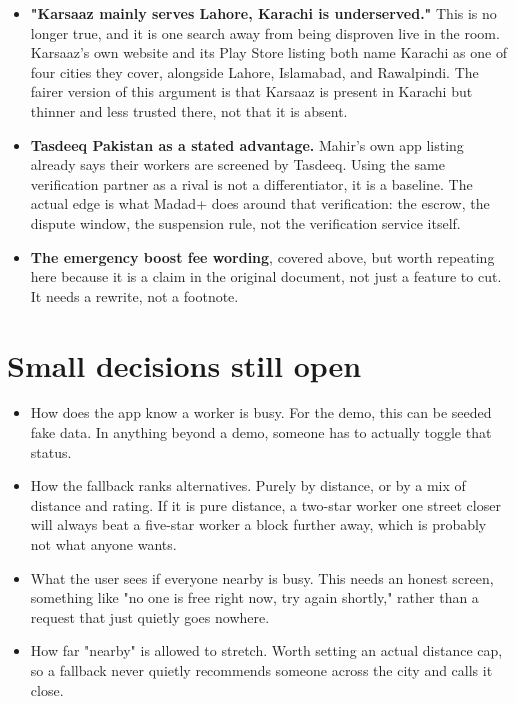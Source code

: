 \documentclass[11pt,a4paper]{article}
\begin{document}
\begin{itemize}
  \item \textbf{"Karsaaz mainly serves Lahore, Karachi is underserved."} This is no longer true, and it is one search away from being disproven live in the room. Karsaaz's own website and its Play Store listing both name Karachi as one of four cities they cover, alongside Lahore, Islamabad, and Rawalpindi. The fairer version of this argument is that Karsaaz is present in Karachi but thinner and less trusted there, not that it is absent.
  \item \textbf{Tasdeeq Pakistan as a stated advantage.} Mahir's own app listing already says their workers are screened by Tasdeeq. Using the same verification partner as a rival is not a differentiator, it is a baseline. The actual edge is what Madad+ does around that verification: the escrow, the dispute window, the suspension rule, not the verification service itself.
  \item \textbf{The emergency boost fee wording}, covered above, but worth repeating here because it is a claim in the original document, not just a feature to cut. It needs a rewrite, not a footnote.
\end{itemize}

\section{Small decisions still open}

\begin{itemize}
  \item How does the app know a worker is busy. For the demo, this can be seeded fake data. In anything beyond a demo, someone has to actually toggle that status.
  \item How the fallback ranks alternatives. Purely by distance, or by a mix of distance and rating. If it is pure distance, a two-star worker one street closer will always beat a five-star worker a block further away, which is probably not what anyone wants.
  \item What the user sees if everyone nearby is busy. This needs an honest screen, something like "no one is free right now, try again shortly," rather than a request that just quietly goes nowhere.
  \item How far "nearby" is allowed to stretch. Worth setting an actual distance cap, so a fallback never quietly recommends someone across the city and calls it close.
\end{itemize}
\end{document}

